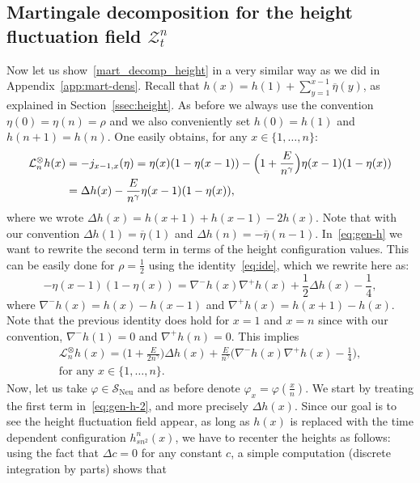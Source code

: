 \documentclass[10pt]{amsart}
\theoremstyle{definition}\newtheorem{defi}[theo]{Definition}\newtheorem{rema}[theo]{Remark}\newtheorem{exam}[theo]{Example}\newtheorem{exem}[theo]{Example}\newtheorem{nota}[theo]{Notation}
\DeclareMathOperator{\Neu}{Neu}
\newcommand{\mc}[1]{{\mathcal #1}}
\renewcommand{\mc}[1]{{\mathcal #1}}
\newcommand{\SN}{\ensuremath{\mc S_{\Neu}}}
\renewcommand{\bar}{\overline}
\begin{document}
\subsection{Martingale decomposition for the height fluctuation field \texorpdfstring{$\mc Z_t^n$}{Ztn}}\label{app:mart_dec_height}

Now let us show~\eqref{mart_decomp_height} in a very similar way as we did in Appendix~\ref{app:mart-dens}. Recall that $h(x)=h(1)+\sum_{y=1}^{x-1} \bar\eta(y)$, as explained in Section~\ref{ssec:height}. As before we always use the convention $\eta(0)=\eta(n)=\rho$ and we also conveniently set $h(0)=h(1)$ and $h(n+1)=h(n)$. One easily obtains, for any $x\in\{1,\dots,n\}$:
\begin{align}
\mc L_n^\otimes h(x) & = - j_{x - 1, x} (\eta) = \eta (x) (1 - \eta (x - 1)) -
\Big(1 + \frac{E}{n^{\gamma}} \Big) \eta (x - 1) (1 - \eta (x)) \notag\\
& = \Delta h(x) - \frac{E}{n^{\gamma}} \eta (x - 1) (1 - \eta (x)), \label{eq:gen-h}
\end{align}
where we wrote $\Delta h (x) = h (x + 1) + h (x - 1) - 2 h (x)$. Note that with our convention $\Delta h(1)=\bar \eta(1)$ and $\Delta h(n)=-\bar\eta(n-1)$. In~\eqref{eq:gen-h} we want to rewrite the second term in terms of the height configuration values. This can be easily done for $\rho=\frac12$ using the identity~\eqref{eq:ide}, which we rewrite here as:
\[
- \eta (x - 1) (1 - \eta (x)) = \nabla^- h (x) \nabla^+ h (x) + \frac{1}{2} \Delta h (x) - \frac{1}{4},
\]
where $\nabla^-h(x)=h(x)-h(x-1)$ and $\nabla^+h(x)=h(x+1)-h(x)$. Note that the previous identity does hold for $x=1$ and $x=n$ since with our convention, $\nabla^-h(1)=0$ and $\nabla^+h(n)=0$. This implies
\begin{multline}
\mc L_n^\otimes h(x) = \Big(1+\frac{E}{2n^\gamma}\Big)\Delta h(x) + \frac{E}{n^\gamma} \Big(\nabla^- h (x) \nabla^+ h (x) - \frac14\Big), \\ \text{for any } x\in\{1,\dots,n\}.\label{eq:gen-h-2}
\end{multline}
Now, let us take $\varphi \in \SN$ and as before denote $\varphi_x=\varphi(\frac x n)$. We start by treating the first term in~\eqref{eq:gen-h-2}, and more precisely $\Delta h(x)$. Since our goal is to see the height fluctuation field appear, as long as $h(x)$ is replaced with the time dependent configuration $h_{sn^2}^n(x)$, we have to recenter the heights as follows: using the fact that $\Delta c=0$ for any constant $c$, a simple computation (discrete integration by parts) shows that
\end{document}
